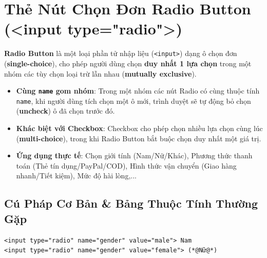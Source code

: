 \documentclass[11pt,oneside]{book}
\newcommand{\codeinline}[1]{\textcolor{accentOrange}{\texttt{#1}}}
\newcommand{\term}[1]{\textbf{\textcolor{primaryBlue}{#1}}}
\begin{document}
\section[Thẻ Nút Chọn Đơn Radio Button]{Thẻ Nút Chọn Đơn Radio Button (<input type="radio">)}
\label{sec:html_radio_button}

\begin{conceptBox}
\term{Radio Button} là một loại phần tử nhập liệu (\codeinline{<input>}) dạng ô chọn đơn (\term{single-choice}), cho phép người dùng chọn \textbf{duy nhất 1 lựa chọn} trong một nhóm các tùy chọn loại trừ lẫn nhau (\term{mutually exclusive}).
\begin{itemize}[leftmargin=1.5em, itemsep=2pt, parsep=0pt]
    \item \textbf{Cùng \codeinline{name} gom nhóm}: Trong một nhóm các nút Radio có cùng thuộc tính \codeinline{name}, khi người dùng tích chọn một ô mới, trình duyệt sẽ tự động bỏ chọn (\term{uncheck}) ô đã chọn trước đó.
    \item \textbf{Khác biệt với Checkbox}: Checkbox cho phép chọn nhiều lựa chọn cùng lúc (\term{multi-choice}), trong khi Radio Button bắt buộc chọn duy nhất một giá trị.
    \item \textbf{Ứng dụng thực tế}: Chọn giới tính (Nam/Nữ/Khác), Phương thức thanh toán (Thẻ tín dụng/PayPal/COD), Hình thức vận chuyển (Giao hàng nhanh/Tiết kiệm), Mức độ hài lòng,...
\end{itemize}
\end{conceptBox}

\subsection{Cú Pháp Cơ Bản \& Bảng Thuộc Tính Thường Gặp}

\begin{codeWindow}
\begin{lstlisting}[language=HTML5]
<input type="radio" name="gender" value="male"> Nam
<input type="radio" name="gender" value="female"> (*@Nữ@*)
\end{lstlisting}
\end{codeWindow}
\end{document}
